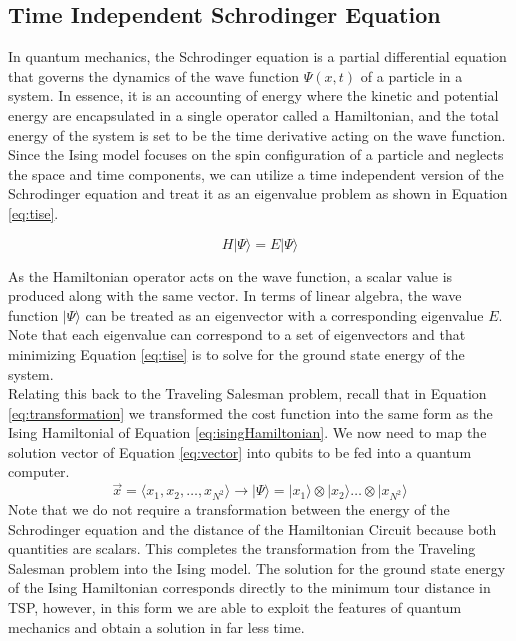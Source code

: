 \subsection{Time Independent Schrodinger Equation}
In quantum mechanics, the Schrodinger equation is a partial differential equation that governs the dynamics of the wave function $\Psi(x,t)$ of a particle in a system. 
In essence, it is an accounting of energy where the kinetic and potential energy are encapsulated in a single operator called a Hamiltonian, and the total energy of the system is set to be the time derivative acting on the wave function. 
Since the Ising model focuses on the spin configuration of a particle and neglects the space and time components, we can utilize a time independent version of the Schrodinger equation and treat it as an eigenvalue problem as shown in Equation \ref{eq:tise}. 

\begin{equation}
	H | \Psi \rangle = E | \Psi \rangle
	\label{eq:tise}
\end{equation}

As the Hamiltonian operator acts on the wave function, a scalar value is produced along with the same vector. 
In terms of linear algebra, the wave function $| \Psi \rangle$ can be treated as an eigenvector with a corresponding eigenvalue $E$. 
Note that each eigenvalue can correspond to a set of eigenvectors and that minimizing Equation \ref{eq:tise} is to solve for the ground state energy of the system. \\

Relating this back to the Traveling Salesman problem, recall that in Equation \ref{eq:transformation} we transformed the cost function into the same form as the Ising Hamiltonial of Equation \ref{eq:isingHamiltonian}. We now need to map the solution vector of Equation \ref{eq:vector} into qubits to be fed into a quantum computer. 
\begin{equation}
	\vec{x} = \langle x_1, x_2, \dots, x_{N^2} \rangle \rightarrow |\Psi\rangle = |x_1\rangle \otimes |x_2\rangle \dots \otimes  |x_{N^2}\rangle 
\end{equation}
Note that we do not require a transformation between the energy of the Schrodinger equation and the distance of the Hamiltonian Circuit because both quantities are scalars. This completes the transformation from the Traveling Salesman problem into the Ising model. The solution for the ground state energy of the Ising Hamiltonian corresponds directly to the minimum tour distance in TSP, however, in this form we are able to exploit the features of quantum mechanics and obtain a solution in far less time. 